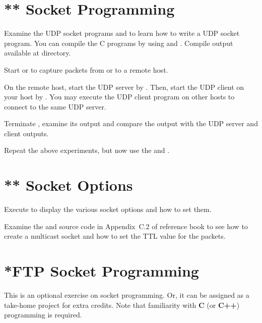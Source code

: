 \documentclass{../UTNetLab}
\begin{document}
\section{** Socket Programming}
Examine the UDP socket programs  and  to learn how to write a UDP socket program.
You can compile the C programs by using  and .
Compile output available at  directory.

Start  or  to capture packets from or to a remote host.

On the remote host, start the UDP server by .
Then, start the UDP client on your host by .
You may execute the UDP client program on other hosts to connect to the same UDP server.

Terminate , examine its output and compare the output with the UDP server and client outputs.

Repeat the above experiments, but now use the  and .

\section{** Socket Options}
Execute  to display the various socket options and how to set them.

Examine the  and  source code in Appendix~C.2 of reference book to see how to create a multicast socket and how to set the TTL value for the packets.


\section{*FTP Socket Programming}
This is an optional exercise on socket programming.
Or, it can be assigned as a take-home project for extra credits.
Note that familiarity with \textbf{C} (or \textbf{C++}) programming is required.
\end{document}
